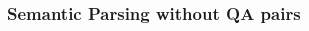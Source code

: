\documentclass[mathserif,12pt]{beamer}
\begin{document}
\begin{frame}
\frametitle{Semantic Parsing without QA pairs}
\vspace{-1em}
\begin{columns}
  \begin{column}{0.05\textwidth}
  \end{column}
 \begin{column}{0.55\textwidth}
 \end{column}


\end{columns}
\end{frame}
\end{document}
